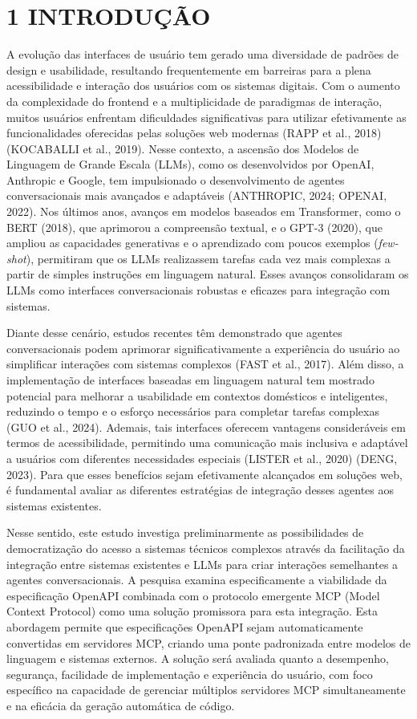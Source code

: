 \documentclass[
]{article}
\begin{document}
\section{1 INTRODUÇÃO}\label{introduuxe7uxe3o}

A evolução das interfaces de usuário tem gerado uma diversidade de
padrões de design e usabilidade, resultando frequentemente em barreiras
para a plena acessibilidade e interação dos usuários com os sistemas
digitais. Com o aumento da complexidade do frontend e a multiplicidade
de paradigmas de interação, muitos usuários enfrentam dificuldades
significativas para utilizar efetivamente as funcionalidades oferecidas
pelas soluções web modernas (RAPP et al., 2018) (KOCABALLI et al.,
2019). Nesse contexto, a ascensão dos Modelos de Linguagem de Grande
Escala (LLMs), como os desenvolvidos por OpenAI, Anthropic e Google, tem
impulsionado o desenvolvimento de agentes conversacionais mais avançados
e adaptáveis (ANTHROPIC, 2024; OPENAI, 2022). Nos últimos anos, avanços
em modelos baseados em Transformer, como o BERT (2018), que aprimorou a
compreensão textual, e o GPT-3 (2020), que ampliou as capacidades
generativas e o aprendizado com poucos exemplos (\emph{few-shot}),
permitiram que os LLMs realizassem tarefas cada vez mais complexas a
partir de simples instruções em linguagem natural. Esses avanços
consolidaram os LLMs como interfaces conversacionais robustas e eficazes
para integração com sistemas.

Diante desse cenário, estudos recentes têm demonstrado que agentes
conversacionais podem aprimorar significativamente a experiência do
usuário ao simplificar interações com sistemas complexos (FAST et al.,
2017). Além disso, a implementação de interfaces baseadas em linguagem
natural tem mostrado potencial para melhorar a usabilidade em contextos
domésticos e inteligentes, reduzindo o tempo e o esforço necessários
para completar tarefas complexas (GUO et al., 2024). Ademais, tais
interfaces oferecem vantagens consideráveis em termos de acessibilidade,
permitindo uma comunicação mais inclusiva e adaptável a usuários com
diferentes necessidades especiais (LISTER et al., 2020) (DENG, 2023).
Para que esses benefícios sejam efetivamente alcançados em soluções web,
é fundamental avaliar as diferentes estratégias de integração desses
agentes aos sistemas existentes.

Nesse sentido, este estudo investiga preliminarmente as possibilidades
de democratização do acesso a sistemas técnicos complexos através da
facilitação da integração entre sistemas existentes e LLMs para criar
interações semelhantes a agentes conversacionais. A pesquisa examina
especificamente a viabilidade da especificação OpenAPI combinada com o
protocolo emergente MCP (Model Context Protocol) como uma solução
promissora para esta integração. Esta abordagem permite que
especificações OpenAPI sejam automaticamente convertidas em servidores
MCP, criando uma ponte padronizada entre modelos de linguagem e sistemas
externos. A solução será avaliada quanto a desempenho, segurança,
facilidade de implementação e experiência do usuário, com foco
específico na capacidade de gerenciar múltiplos servidores MCP
simultaneamente e na eficácia da geração automática de código.
\end{document}
